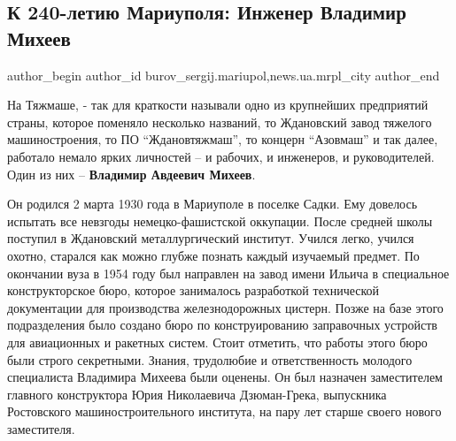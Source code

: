  
 
 
 
 
 
\subsection{К 240-летию Мариуполя: Инженер Владимир Михеев}
\label{sec:29_09_2018.stz.news.ua.mrpl_city.1.k_240_letiu_mariupolja_inzhener_vladimir_miheev}
 
\ifcmt
 author_begin
   author_id burov_sergij.mariupol,news.ua.mrpl_city
 author_end
\fi

На Тяжмаше, - так для краткости называли одно из крупнейших предприятий страны,
которое поменяло несколько названий, то Ждановский завод тяжелого
машиностроения, то ПО \enquote{Ждановтяжмаш}, то концерн \enquote{Азовмаш} и так далее,
работало немало ярких личностей – и рабочих, и инженеров, и руководителей. Один
из них – \textbf{Владимир Авдеевич Михеев}.

Он родился 2 марта 1930 года в Мариуполе в поселке Садки. Ему довелось испытать
все невзгоды немецко-фашистской оккупации. После средней школы поступил в
Ждановский металлургический институт. Учился легко, учился охотно, старался как
можно глубже познать каждый изучаемый предмет. По окончании вуза в 1954 году
был направлен на завод имени Ильича в специальное конструкторское бюро, которое
занималось разработкой технической документации для производства
железнодорожных цистерн. Позже на базе этого подразделения было создано бюро по
конструированию заправочных устройств для авиационных и ракетных систем. Стоит
отметить, что работы этого бюро были строго секретными. Знания, трудолюбие и
ответственность молодого специалиста Владимира Михеева были оценены. Он был
назначен заместителем главного конструктора Юрия Николаевича Дзюман-Грека,
выпускника Ростовского машиностроительного института, на пару лет старше своего
нового заместителя.


